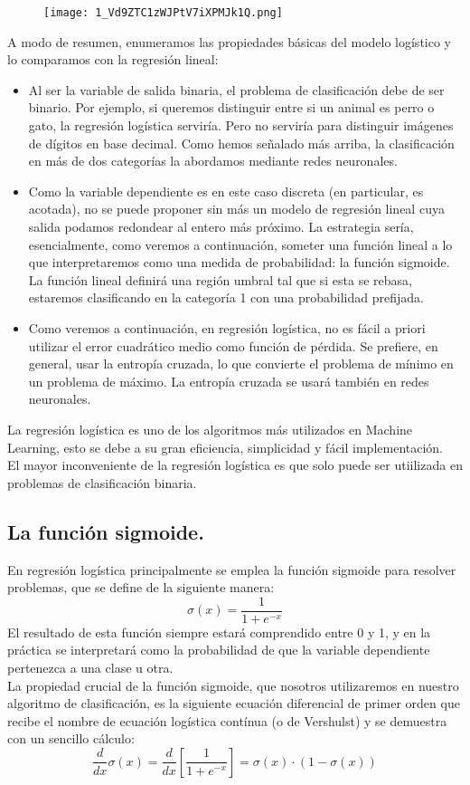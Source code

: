 \documentclass[a4paper,10pt]{article}
\begin{document}
\begin{figure}[H]
\centering
\texttt{[image: 1\_Vd9ZTC1zWJPtV7iXPMJk1Q.png]}
\end{figure}
A modo de resumen, enumeramos las propiedades básicas del modelo logístico y lo comparamos con la regresión lineal:

\begin{itemize}
\item Al ser la variable de salida binaria, el problema de clasificación debe de ser binario. Por ejemplo, si queremos distinguir entre si un animal es perro o gato, la regresión logística serviría. Pero no serviría para distinguir imágenes de dígitos en base decimal. Como hemos señalado más arriba, la clasificación en más de dos categorías la abordamos mediante redes neuronales.
\item Como la variable dependiente es en este caso discreta (en particular, es acotada), no se puede proponer sin más un modelo de regresión lineal cuya salida
podamos redondear al entero más próximo. La estrategia sería, esencialmente,
como veremos a continuación, someter una función lineal a lo que interpretaremos como una medida de probabilidad: la función sigmoide. La función lineal
definirá una región umbral tal que si esta se rebasa, estaremos clasificando en la
categoría 1 con una probabilidad prefijada.

\item Como veremos a continuación, en regresión logística, no es fácil a priori utilizar el error cuadrático medio como función de pérdida. Se prefiere, en general,
usar la entropía cruzada, lo que convierte el problema de mínimo en un problema
de máximo. La entropía cruzada se usará también en redes neuronales.

\end{itemize}
La regresión logística es uno de los algoritmos más utilizados en Machine Learning, esto se debe a su gran eficiencia, simplicidad y fácil implementación.\\
El mayor inconveniente de la regresión logística es que solo puede ser utiilizada en problemas de clasificación binaria.

\subsection{La función sigmoide.}
En regresión logística principalmente se emplea la función sigmoide para resolver problemas, que se define de la siguiente manera: 
\[
\sigma(x)=\frac{1}{1+e^{-x}}
\]
El resultado de esta función siempre estará comprendido entre 0 y 1, y en la práctica se interpretará como la probabilidad de que la variable dependiente pertenezca a una clase u otra.\\
La propiedad crucial de la función sigmoide, que nosotros utilizaremos en nuestro algoritmo de clasificación, es la siguiente ecuación diferencial de primer
orden que recibe el nombre de ecuación logística contínua (o de Vershulst) y se demuestra con un sencillo cálculo:
\[
\frac{d}{dx}\sigma(x)=\frac{d}{dx}\left[\frac{1}{1+e^{-x}}\right]=\sigma(x)\cdot(1-\sigma(x))
\]
\end{document}
